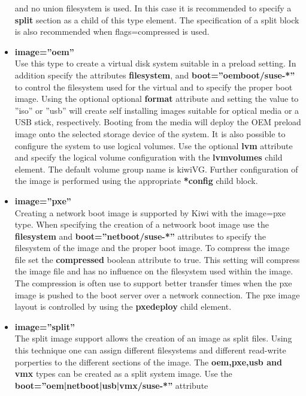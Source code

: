 \begin{itemize}
      and no union filesystem is used. In this case it is recommended to
      specify a \textbf{split} section as a child of this type element. The
      specification of a split block is also recommended when flags=compressed
      is used.
\item \textbf{image=''oem''}\\
      Use this type to create a virtual disk system suitable in a preload
      setting. In addition specify the attributes \textbf{filesystem}, 
      and \textbf{boot=''oemboot/suse-*''} to control the filesystem used
      for the virtual and to specify the proper boot image. Using the optional
      optional \textbf{format} attribute and setting the value to ''iso'' or 
      ''usb'' will create self installing images suitable for optical media
      or a USB stick, respectively. Booting from the media will deploy
      the OEM preload image onto the selected storage device of the
      system. It is also possible to configure the system to use logical
      volumes. Use the optional \textbf{lvm} attribute and specify the
      logical volume configuration with the \textbf{lvmvolumes} child
      element. The default volume group name is kiwiVG. Further configuration
      of the image is performed using the appropriate \textbf{*config} child
      block.
\item \textbf{image=''pxe''}\\
      Creating a network boot image is supported by Kiwi with the image=pxe
      type. When specifying the creation of a netwoork boot image use the
      \textbf{filesystem} and \textbf{boot=''netboot/suse-*''} attributes 
      to specify the filesystem of the image and the proper boot image. To
      compress the image file set the \textbf{compressed} boolean attribute
      to true. This setting will compress the image file and has no influence
      on the filesystem used within the image. The compression is often use to
      support better transfer times when the pxe image is pushed to the 
      boot server over a network connection. The pxe image layout is
      controlled by using the \textbf{pxedeploy} child element.
\item \textbf{image=''split''}\\
      The split image support allows the creation of an image as split
      files. Using this technique one can assign different filesystems and
      different read-write porperties to the different sections of the image.
      The \textbf{oem,pxe,usb and vmx} types can be created as a split system
      image. Use the \textbf{boot=''oem|netboot|usb|vmx/suse-*''} attribute

\end{itemize}
